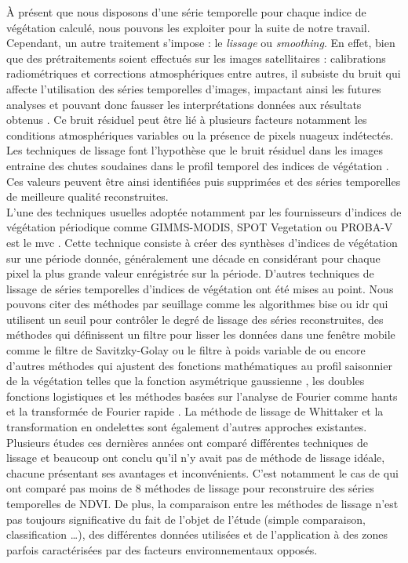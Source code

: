 \`A présent que nous disposons d'une série temporelle pour chaque indice de végétation calculé, nous pouvons les exploiter pour la suite de notre travail. Cependant, un autre traitement s'impose : le \emph{lissage} ou \emph{smoothing}. En effet, bien que des prétraitements soient effectués sur les images satellitaires : calibrations radiométriques et corrections atmosphériques entre autres, il subsiste du bruit qui affecte l'utilisation des séries temporelles d'images, impactant ainsi les futures analyses et pouvant donc fausser les interprétations données aux résultats obtenus \citep{Chen2004}. Ce bruit résiduel peut être lié à plusieurs facteurs notamment les conditions atmosphériques variables ou la présence de pixels nuageux indétectés. Les techniques de lissage font l'hypothèse que le bruit résiduel dans les images entraine des chutes soudaines dans le profil temporel des indices de végétation \citep{Bojanowski2009}. Ces valeurs peuvent être ainsi identifiées puis supprimées et des séries temporelles de meilleure qualité reconstruites.
\\L'une des techniques usuelles adoptée notamment par les fournisseurs d'indices de végétation périodique comme GIMMS-MODIS, SPOT Vegetation ou PROBA-V est le \acrshort{mvc} \citep{Holben1986}. Cette technique 
consiste à créer des synthèses d'indices de végétation sur une période donnée, généralement une décade en considérant pour chaque pixel la plus grande valeur enrégistrée sur la période.
D'autres techniques de lissage de séries temporelles d'indices de végétation ont été mises au point. Nous pouvons citer des méthodes par seuillage comme les algorithmes \acrshort{bise} \citep{Viovy1992} ou \acrshort{idr} \citep{Julien2010} qui utilisent un seuil pour contrôler le degré de lissage des séries reconstruites, des méthodes qui définissent un filtre pour lisser les données dans une fenêtre mobile comme le filtre de Savitzky-Golay \citep{Savitzky1964, Chen2004} ou le filtre à poids variable de \citet{Zhu2012} ou encore d'autres méthodes qui ajustent des fonctions mathématiques au profil saisonnier de la végétation telles que la fonction asymétrique gaussienne \citep{Jonsson2002}, les doubles fonctions logistiques \citep{Beck2006} et les méthodes basées sur l'analyse de Fourier comme \acrshort{hants} \citep{Verhoef1996, Roerink2000} et la transformée de Fourier rapide \citep{Menenti1993}. La méthode de lissage de Whittaker \citep{Eilers2003,Atzberger2011} et la transformation en ondelettes \citep{Lu2007} sont également d'autres approches existantes.
\\Plusieurs études ces dernières années ont comparé différentes techniques de lissage \citep{Jonsson2002,Chen2004,Hird2009,Kandasamy2012,Geng2014,Shao2016,Liu2017} et beaucoup ont conclu qu'il n'y avait pas de méthode de lissage idéale, chacune présentant ses avantages et inconvénients. C'est notamment le cas de \citet{Geng2014} qui ont comparé pas moins de 8 méthodes de lissage pour reconstruire des séries temporelles de NDVI. De plus, la comparaison entre les méthodes de lissage n'est pas toujours significative du fait de l'objet de l'étude (simple comparaison, classification \ldots{}), des différentes données utilisées et de l'application à des zones parfois caractérisées par des facteurs environnementaux opposés. 
